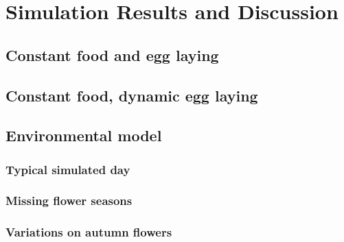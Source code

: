 \section{Simulation Results and Discussion}
\subsection{Constant food and egg laying}
\subsection{Constant food, dynamic egg laying}
\subsection{Environmental model}
	\subsubsection{Typical simulated day}
	
	\subsubsection{Missing flower seasons}
	\subsubsection{Variations on autumn flowers}

